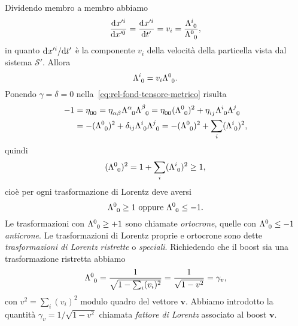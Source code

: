 Dividendo membro a membro abbiamo
\begin{equation}
  \toder{x'^{i}}{x'^{0}} = \toder{x'^{i}}{t'} = v_{i} =
  \frac{\tensor{\Lambda}{^{i}_{0}}}{\tensor{\Lambda}{^{0}_{0}}},
\end{equation}
in quanto $\mathrm{d}^{}x'^{i} / \mathrm{d} {t'}^{}$ è la componente $v_{i}$ della velocità della
particella vista dal sistema $\mathcal{S}'$.  Allora
\begin{equation}
  \tensor{\Lambda}{^{i}_{0}} = v_{i}\tensor{\Lambda}{^{0}_{0}}.
\end{equation}
Ponendo $\gamma = \delta = 0$ nella~\eqref{eq:rel-fond-tensore-metrico} risulta
\begin{equation}
  \begin{split}
    -1 &= \tensor{\eta}{_{00}} = \tensor{\eta}{_{\alpha\beta}}
    \tensor{\Lambda}{^{\alpha}_{0}} \tensor{\Lambda}{^{\beta}_{0}} =
    \tensor{\eta}{_{00}}(\tensor{\Lambda}{^{0}_{0}})^{2} + \tensor{\eta}{_{ij}}
    \tensor{\Lambda}{^{i}_{0}} \tensor{\Lambda}{^{j}_{0}}
    \\
    &= -(\tensor{\Lambda}{^{0}_{0}})^{2} + \delta_{ij}
    \tensor{\Lambda}{^{i}_{0}} \tensor{\Lambda}{^{j}_{0}} =
    -(\tensor{\Lambda}{^{0}_{0}})^{2}+\sum_{i}(\tensor{\Lambda}{^{i}_{0}})^{2},
  \end{split}
\end{equation}
quindi
\begin{equation}
  (\tensor{\Lambda}{^{0}_{0}})^{2} = 1 +
  \sum_{i}(\tensor{\Lambda}{^{i}_{0}})^{2} \geq 1,
\end{equation}
cioè per ogni trasformazione di Lorentz deve aversi
\begin{equation}
  \tensor{\Lambda}{^{0}_{0}} \geq 1 \text{ oppure } \tensor{\Lambda}{^{0}_{0}}
  \leq -1.
\end{equation}
Le trasformazioni con $\tensor{\Lambda}{^{0}_{0}} \geq +1$ sono chiamate
\emph{ortocrone}, quelle con $\tensor{\Lambda}{^{0}_{0}} \leq -1$
\emph{anticrone}.  Le trasformazioni di Lorentz proprie e ortocrone sono dette
\emph{trasformazioni di Lorentz ristrette} o \emph{speciali}.  Richiedendo che
il boost sia una trasformazione ristretta abbiamo
\begin{equation}
  \tensor{\Lambda}{^{0}_{0}} = \frac{1}{\sqrt{1-\sum_{i}(v_{i})^{2}}} =
  \frac{1}{\sqrt{1-v^{2}}} = \gamma_{v},
\end{equation}
con $v^{2} = \sum_{i}(v_{i})^{2}$ modulo quadro del vettore $\bm{v}$.  Abbiamo
introdotto la quantità $\gamma_{v} = 1/\sqrt{1-v^{2}}$ chiamata
\emph{fattore di Lorentz} associato al boost $\bm{v}$.
